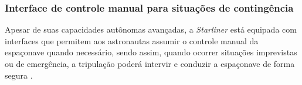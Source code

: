 \subsubsection{Interface de controle manual para situações de contingência}
Apesar de suas capacidades autônomas avançadas, a \emph{Starliner} está equipada com interfaces que permitem aos astronautas assumir o controle manual da espaçonave quando necessário, sendo assim, quando ocorrer situações imprevistas ou de emergência, a tripulação poderá intervir e conduzir a espaçonave de forma segura \cite{boeing2024}.